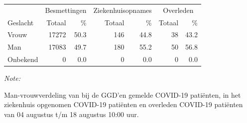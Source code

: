 \documentclass[
  english,
  man,floatsintext]{apa6}
\begin{document}
\begin{table}
\centering\begingroup\fontsize{11}{13}\selectfont

\begin{threeparttable}
\begin{tabular}{lrrrrrr}
\toprule
\multicolumn{1}{c}{ } & \multicolumn{2}{c}{Besmettingen} & \multicolumn{2}{c}{Ziekenhuisopnames} & \multicolumn{2}{c}{Overleden} \\
\cmidrule(l{3pt}r{3pt}){2-3} \cmidrule(l{3pt}r{3pt}){4-5} \cmidrule(l{3pt}r{3pt}){6-7}
Geslacht & Totaal & \% & Totaal & \% & Totaal & \%\\
\midrule
Vrouw & 17272 & 50.3 & 146 & 44.8 & 38 & 43.2\\
Man & 17083 & 49.7 & 180 & 55.2 & 50 & 56.8\\
Onbekend & 0 & 0.0 & 0 & 0.0 & 0 & 0.0\\
\bottomrule
\end{tabular}
\begin{tablenotes}
\item \textit{Note: } 
\item Man-vrouwverdeling van bij de GGD’en gemelde COVID-19 patiënten, in het ziekenhuis opgenomen COVID-19 patiënten en overleden COVID-19 patiënten van 04 augustus t/m 18 augustus 10:00 uur.
\end{tablenotes}
\end{threeparttable}
\endgroup{}
\end{table}
\newpage
\end{document}
